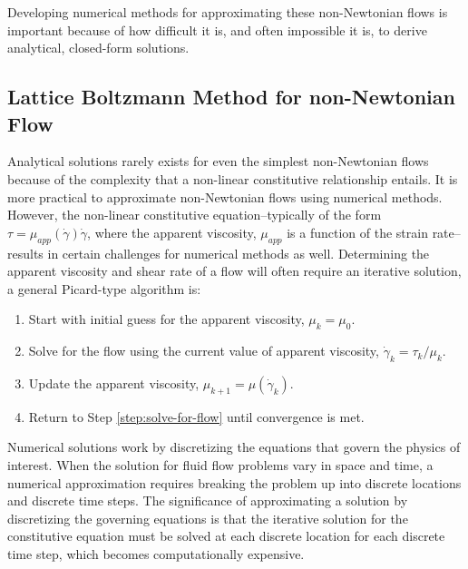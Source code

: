 \documentclass{article}
\begin{document}
Developing numerical methods for approximating these non-Newtonian flows is important because of how difficult it is, and often impossible it is, to derive analytical, closed-form solutions.

\subsection{Lattice Boltzmann Method for non-Newtonian Flow}

Analytical solutions rarely exists for even the simplest non-Newtonian flows because of the complexity that a non-linear constitutive relationship entails.
It is more practical to approximate non-Newtonian flows using numerical methods.
However, the non-linear constitutive equation--typically of the form $\tau = \mu_{app}(\dot{\gamma}) \dot{\gamma}$, where the apparent viscosity, $\mu_{app}$ is a function of the strain rate--results in certain challenges for numerical methods as well.
Determining the apparent viscosity and shear rate of a flow will often require an iterative solution, a general Picard-type algorithm is:

\begin{enumerate}
	\item Start with initial guess for the apparent viscosity, $\mu_k = \mu_0$.
	\item \label{step:solve-for-flow} Solve for the flow using the current value of apparent viscosity, $\dot{\gamma}_k = \tau_k / \mu_k$.
	\item Update the apparent viscosity, $\mu_{k+1} = \mu(\dot{\gamma}_k)$.
	\item Return to Step \ref{step:solve-for-flow} until convergence is met.
\end{enumerate}

Numerical solutions work by discretizing the equations that govern the physics of interest.
When the solution for fluid flow problems vary in space and time, a numerical approximation requires breaking the problem up into discrete locations and discrete time steps.
The significance of approximating a solution by discretizing the governing equations is that the iterative solution for the constitutive equation must be solved at each discrete location for each discrete time step, which becomes computationally expensive.
\end{document}
